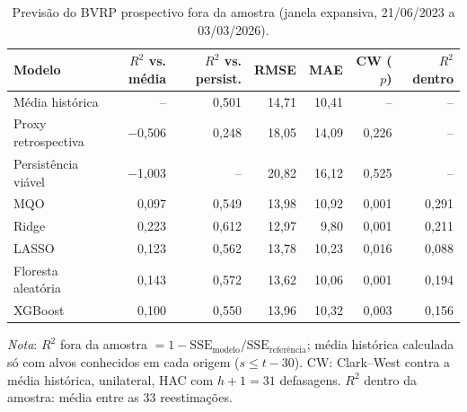 \begin{table}[H]
\centering
\small
\caption{Previsão do BVRP prospectivo fora da amostra (janela expansiva, 21/06/2023 a 03/03/2026).}
\label{tab:T5-previsao}
\begin{tabular}{lrrrrrr}
\toprule
Modelo & $R^2$ vs. média & $R^2$ vs. persist. & RMSE & MAE & CW ($p$) & $R^2$ dentro \\
\midrule
Média histórica & -- & 0{,}501 & 14{,}71 & 10{,}41 & -- & -- \\
Proxy retrospectiva & $-$0{,}506 & 0{,}248 & 18{,}05 & 14{,}09 & 0{,}226 & -- \\
Persistência viável & $-$1{,}003 & -- & 20{,}82 & 16{,}12 & 0{,}525 & -- \\
MQO & 0{,}097 & 0{,}549 & 13{,}98 & 10{,}92 & 0{,}001 & 0{,}291 \\
Ridge & 0{,}223 & 0{,}612 & 12{,}97 & 9{,}80 & 0{,}001 & 0{,}211 \\
LASSO & 0{,}123 & 0{,}562 & 13{,}78 & 10{,}23 & 0{,}016 & 0{,}088 \\
Floresta aleatória & 0{,}143 & 0{,}572 & 13{,}62 & 10{,}06 & 0{,}001 & 0{,}194 \\
XGBoost & 0{,}100 & 0{,}550 & 13{,}96 & 10{,}32 & 0{,}003 & 0{,}156 \\
\bottomrule
\end{tabular}
\par\smallskip
\footnotesize\textit{Nota}: $R^2$ fora da amostra $= 1 - \text{SSE}_{\text{modelo}}/\text{SSE}_{\text{referência}}$; média histórica calculada só com alvos conhecidos em cada origem ($s \leq t - 30$). CW: Clark--West contra a média histórica, unilateral, HAC com $h+1 = 31$ defasagens. $R^2$ dentro da amostra: média entre as 33 reestimações.
\end{table}

